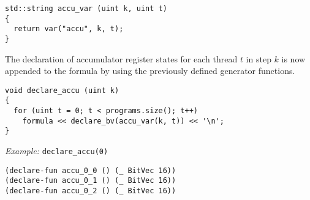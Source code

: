 \begin{lstlisting}[style=c++]
std::string accu_var (uint k, uint t)
{
  return var("accu", k, t);
}
\end{lstlisting}

\noindent
The declaration of accumulator register states for each thread $t$ in step $k$ is now appended to the formula by using the previously defined generator functions.

\begin{lstlisting}[style=c++]
void declare_accu (uint k)
{
  for (uint t = 0; t < programs.size(); t++)
    formula << declare_bv(accu_var(k, t)) << '\n';
}
\end{lstlisting}

\noindent
\emph{Example:} \lstinline[style=c++]{declare_accu(0)}

% 
\begin{lstlisting}[language=SMTLib]
(declare-fun accu_0_0 () (_ BitVec 16))
(declare-fun accu_0_1 () (_ BitVec 16))
(declare-fun accu_0_2 () (_ BitVec 16))
\end{lstlisting}

